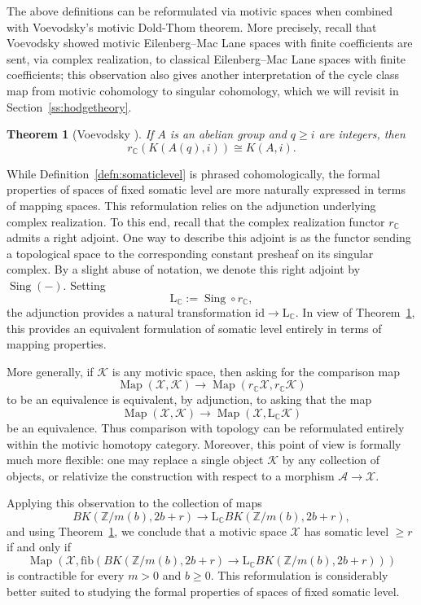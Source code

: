 \documentclass[11pt,leqno]{article}
\newcommand{\Map}{\operatorname{Map}}
\newcommand{\Id}{\mathrm{id}}
\newcommand{\cplx}{{\mathbb C}}
\newcommand{\Z}{{\mathbb Z}}
\renewcommand{\1}{{\rm 1\hspace*{-0.4ex}%
\rule{0.1ex}{1.52ex}\hspace*{0.2ex}}}
\renewcommand{\L}{{\mathrm L}}
\newcommand{\<}[1]{{\langle}#1 {\rangle}}
\newcommand{\Sing}{\operatorname{Sing}}
\newcommand{\fib}{\mathrm{fib}}
\theoremstyle{plain}
\newtheorem{theorem}{Theorem}[subsection]
\theoremstyle{definition}
\theoremstyle{remark}
\numberwithin{equation}{subsection}
\begin{document}
The above definitions can be reformulated via motivic spaces when combined with Voevodsky's motivic Dold-Thom theorem.  More precisely, recall that Voevodsky showed motivic Eilenberg--Mac Lane spaces with finite coefficients are sent, via complex realization, to classical Eilenberg--Mac Lane spaces with finite coefficients; this observation also gives another interpretation of the cycle class map from motivic cohomology to singular cohomology, which we will revisit in Section~\ref{ss:hodgetheory}.  

\begin{theorem}[Voevodsky {\cite[Corollary 3.48]{VMEM}}]
	\label{thm:VoevodskyDoldKan}
	If $A$ is an abelian group and $q \geq i$ are integers, then 
	\[
	r_{\cplx}(K(A(q),i)) \cong K(A,i).
	\]
\end{theorem}

While Definition~\ref{defn:somaticlevel} is phrased cohomologically, the formal properties of spaces of fixed somatic level are more naturally expressed in terms of mapping spaces. This reformulation relies on the adjunction underlying complex realization. To this end, recall that the complex realization functor $r_{\cplx}$ admits a right adjoint. One way to describe this adjoint is as the functor sending a topological space to the corresponding constant presheaf on its singular complex. By a slight abuse of notation, we denote this right adjoint by $\Sing(-)$.  Setting 
\[
\L_{\cplx} := \Sing \circ r_{\cplx},
\] 
the adjunction provides a natural transformation $\Id \to \L_{\cplx}$.  In view of Theorem~\ref{thm:VoevodskyDoldKan}, this provides an equivalent formulation of somatic level entirely in terms of mapping properties.

More generally, if $\mathscr{K}$ is any motivic space, then asking for the comparison map
\[
\Map(\mathscr{X},\mathscr{K}) \longrightarrow
\Map(r_{\cplx}\mathscr{X},r_{\cplx}\mathscr{K})
\]
to be an equivalence is equivalent, by adjunction, to asking that the map
\[
\Map(\mathscr{X},\mathscr{K}) \longrightarrow \Map(\mathscr{X},\L_{\cplx}\mathscr{K})
\]
be an equivalence. Thus comparison with topology can be reformulated entirely within the motivic homotopy category. Moreover, this point of view is formally much more flexible: one may replace a single object $\mathscr{K}$ by any collection of objects, or relativize the construction with respect to a morphism $\mathscr{A}\to\mathscr{X}$.

Applying this observation to the collection of maps
\[
BK(\Z/m(b),2b+r)\longrightarrow
\L_{\cplx}BK(\Z/m(b),2b+r),
\]
and using Theorem~\ref{thm:VoevodskyDoldKan}, we conclude that a motivic space $\mathscr{X}$ has somatic level $\ge r$ if and only if
\[
\Map\!\left(
\mathscr{X},
\fib\!\left(
BK(\Z/m(b),2b+r) \to \L_{\cplx}BK(\Z/m(b),2b+r)\right) \right)
\]
is contractible for every $m>0$ and $b\ge0$. This reformulation is considerably better suited to studying the formal properties of spaces of fixed somatic level.
\end{document}
